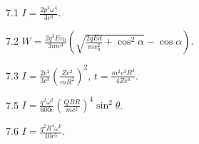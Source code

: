 \protect \section *{\protect {}}
\begin{Solution}{7.{1}}
	$I = \frac{2p^2\omega^4}{3c^3}$.
\end{Solution}
\begin{Solution}{7.{2}}
	$W = \frac{2q^3Ev_0}{3mc^3}\left( \sqrt{\frac{2qEd}{mv_0^2}+\cos^2\alpha} - \cos\alpha\right) $.
\end{Solution}
\begin{Solution}{7.{3}}
	$I = \frac{2e^2}{3c^3} \left( \frac{Ze^2}{mR^2}\right)^2 $, $t = \frac{m^2c^3R^3}{4Ze^4}$.
\end{Solution}
\begin{Solution}{7.{5}}
	$I = \frac{q^2\omega^2}{600c} \left( \frac{QBR}{mc^2}\right)^4 \sin^2\theta $.
\end{Solution}
\begin{Solution}{7.{6}}
	$I = \frac{q^2R^4\omega^6}{10c^5} $.
\end{Solution}
